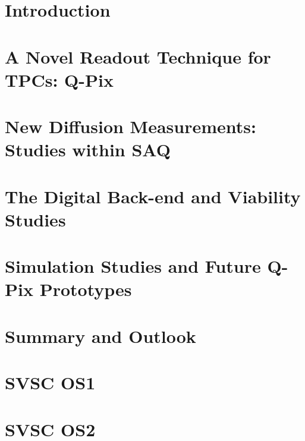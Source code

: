 \documentclass[12pt]{uh_thesis}
\begin{document}
\tableofcontents
\listoffigures
\listoftables
\printnomenclature

\mainmatter

\chapter{Introduction}
\label{chap:intro}



\chapter{A Novel Readout Technique for TPCs: Q-Pix}
\label{chap:qpix}




\chapter{New Diffusion Measurements: Studies within SAQ}
\label{chap:saq}



\chapter{The Digital Back-end and Viability Studies}
\label{chap:qdb}



\chapter{Simulation Studies and Future Q-Pix Prototypes}



\chapter{Summary and Outlook}
\label{chap:summary}




\printbibliography[heading=bibintoc]

\appendix
\chapter{SVSC OS1}
\label{chap:OS1}



\chapter{SVSC OS2}
\label{chap:OS2}



\printindex
\end{document}
